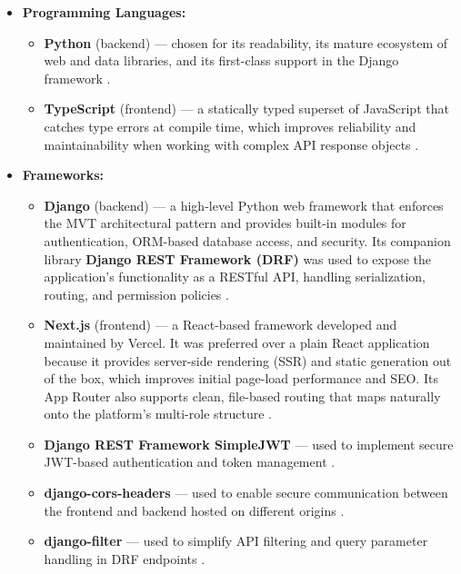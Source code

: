 \begin{itemize}
	
	\item \textbf{Programming Languages:}
	\begin{itemize}
		\item \textbf{Python} (backend) — chosen for its readability, its mature ecosystem of web and data libraries, and its first-class support in the Django framework \cite{VanRossumDrake2009}.
		
		\item \textbf{TypeScript} (frontend) — a statically typed superset of JavaScript that catches type errors at compile time, which improves reliability and maintainability when working with complex API response objects \cite{MicrosoftTypeScript2024}.
	\end{itemize}
	
	\item \textbf{Frameworks:}
	\begin{itemize}
		\item \textbf{Django} (backend) — a high-level Python web framework that enforces the MVT architectural pattern and provides built-in modules for authentication, ORM-based database access, and security. Its companion library \textbf{Django REST Framework (DRF)} was used to expose the application's functionality as a RESTful API, handling serialization, routing, and permission policies \cite{DjangoProject2024,Christie2024DRF}.
		
		\item \textbf{Next.js} (frontend) — a React-based framework developed and maintained by Vercel. It was preferred over a plain React application because it provides server-side rendering (SSR) and static generation out of the box, which improves initial page-load performance and SEO. Its App Router also supports clean, file-based routing that maps naturally onto the platform's multi-role structure \cite{Vercel2024Nextjs}.
		
		\item \textbf{Django REST Framework SimpleJWT} — used to implement secure JWT-based authentication and token management \cite{RFC7519,SimpleJWT2024}.
		
		\item \textbf{django-cors-headers} — used to enable secure communication between the frontend and backend hosted on different origins \cite{OttoKristensen2024CORS}.
		
		\item \textbf{django-filter} — used to simplify API filtering and query parameter handling in DRF endpoints \cite{DjangoFilter2024}.
	\end{itemize}
	

\end{itemize}
